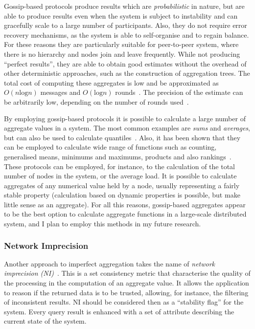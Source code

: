 Gossip-based protocols produce results which are \emph{probabilistic} in nature, but are able to produce results even
when the system is subject to instability and can gracefully scale to a large number of participants. Also, they do not
require error recovery mechanisms, as the system is able to self-organise and to regain balance. For these reasons they
are particularly suitable for peer-to-peer system, where there is no hierarchy and nodes join and leave frequently.
While not producing ``perfect results'', they are able to obtain good estimates without the overhead of other
deterministic approaches, such as the construction of aggregation trees. The total cost of computing these aggregates
is low and be approximated as $O(n\mathrm{log}n)$ messages and $O(\mathrm{log}n)$
rounds~\cite{gossip-aggregates-opt}. The precision of the estimate can be arbitrarily low, depending on the number of
rounds used~\cite{gossip-aggregates-large}.

By employing gossip-based protocols it is possible to calculate a large number of aggregate values in a system. 
The most common examples are \emph{sums} and \emph{averages}, but can also be used to calculate
quantiles~\cite{gossip-aggregates}. Also, it has been shown that they can be employed to calculate wide range of
functions such as counting, generalised means, minimums and maximums, products and also
rankings~\cite{gossip-aggregates-large}.
These protocols can be employed, for instance, to the calculation of the total
number of nodes in the system, or the average load. It is possible to calculate aggregates of any numerical
value held by a node, usually representing a fairly stable property (calculation based on dynamic properties is
possible, but make little sense as an aggregate). For all this reasons, gossip-based aggregates appear to be the best
option to calculate aggregate functions in a large-scale distributed system, and I plan to employ this methods in my
future research.

\subsubsection*{Network Imprecision}

Another approach to imperfect aggregation takes the name of \emph{network imprecision (NI)}~\cite{network-imprecision}.
This is a set consistency metric that characterise the quality of the processing in the computation of an aggregate value.
It allows the application to reason if the returned data is to be trusted, allowing, for instance, the filtering of
inconsistent results. NI should be considered then as a ``stability flag'' for the system. Every query result is
enhanced with a set of attribute describing the current state of the system.


